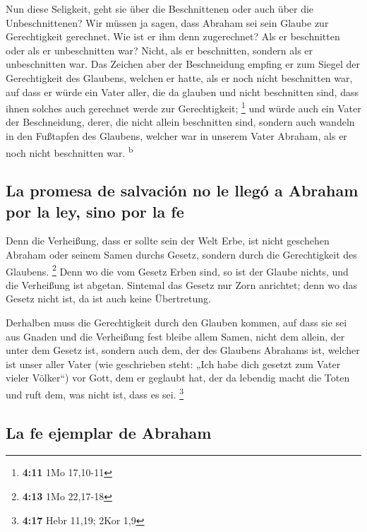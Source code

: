  Nun diese Seligkeit, geht sie über die Beschnittenen oder
auch über die Unbeschnittenen? Wir müssen ja sagen, dass Abraham sei
sein Glaube zur Gerechtigkeit gerechnet.  Wie ist er ihm
denn zugerechnet? Als er beschnitten oder als er unbeschnitten war?
Nicht, als er beschnitten, sondern als er unbeschnitten war.
 Das Zeichen aber der Beschneidung empfing er zum Siegel
der Gerechtigkeit des Glaubens, welchen er hatte, als er noch nicht
beschnitten war, auf dass er würde ein Vater aller, die da glauben und
nicht beschnitten sind, dass ihnen solches auch gerechnet werde zur
Gerechtigkeit; \footnote{\textbf{4:11} 1Mo 17,10-11}  und
würde auch ein Vater der Beschneidung, derer, die nicht allein
beschnitten sind, sondern auch wandeln in den Fußtapfen des Glaubens,
welcher war in unserem Vater Abraham, als er noch nicht beschnitten war.
\textsuperscript{b}

\hypertarget{la-promesa-de-salvaciuxf3n-no-le-lleguxf3-a-abraham-por-la-ley-sino-por-la-fe}{%
\subsection{La promesa de salvación no le llegó a Abraham por la ley,
sino por la
fe}\label{la-promesa-de-salvaciuxf3n-no-le-lleguxf3-a-abraham-por-la-ley-sino-por-la-fe}}

 Denn die Verheißung, dass er sollte sein der Welt Erbe,
ist nicht geschehen Abraham oder seinem Samen durchs Gesetz, sondern
durch die Gerechtigkeit des Glaubens. \footnote{\textbf{4:13} 1Mo
  22,17-18}  Denn wo die vom Gesetz Erben sind, so ist
der Glaube nichts, und die Verheißung ist abgetan. 
Sintemal das Gesetz nur Zorn anrichtet; denn wo das Gesetz nicht ist, da
ist auch keine Übertretung.

 Derhalben muss die Gerechtigkeit durch den Glauben
kommen, auf dass sie sei aus Gnaden und die Verheißung fest bleibe allem
Samen, nicht dem allein, der unter dem Gesetz ist, sondern auch dem, der
des Glaubens Abrahams ist, welcher ist unser aller Vater 
(wie geschrieben steht: „Ich habe dich gesetzt zum Vater vieler
Völker``) vor Gott, dem er geglaubt hat, der da lebendig macht die Toten
und ruft dem, was nicht ist, dass es sei. \footnote{\textbf{4:17} Hebr
  11,19; 2Kor 1,9}

\hypertarget{la-fe-ejemplar-de-abraham}{%
\subsection{La fe ejemplar de Abraham}\label{la-fe-ejemplar-de-abraham}}

